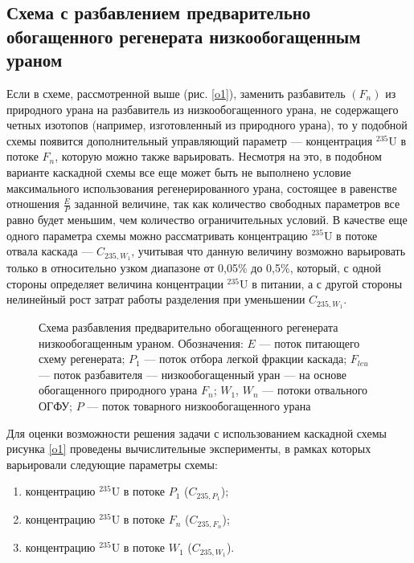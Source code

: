 \subsection{Схема с разбавлением предварительно обогащенного регенерата низкообогащенным ураном}\label{ch2_1_1}

Если в схеме, рассмотренной выше (рис. \ref{o1}), заменить разбавитель $(F_n)$ из природного урана на разбавитель из низкообогащенного урана, не содержащего четных изотопов (например, изготовленный из природного урана), то у подобной схемы появится дополнительный управляющий параметр --- концентрация $^{235}$U в потоке $F_n$, которую можно также варьировать. Несмотря на это, в подобном варианте каскадной схемы все еще может быть не выполнено условие максимального использования регенерированного урана, состоящее в равенстве отношения $\frac{E}{P}$ заданной величине, так как количество свободных параметров все равно будет меньшим, чем количество ограничительных условий. В качестве еще одного параметра схемы можно рассматривать концентрацию $^{235}$U в потоке отвала каскада --- $C_{235, W_1}$, учитывая что данную величину возможно варьировать только в относительно узком диапазоне от 0,05\% до 0,5\%, который, с одной стороны определяет величина концентрации $^{235}$U в питании, а с другой стороны нелинейный рост затрат работы разделения при уменьшении $C_{235, W_1}$. 

\begin{figure}[ht]
  \caption{Схема разбавления предварительно обогащенного регенерата низкообогащенным ураном. Обозначения: $E$ --- поток питающего схему регенерата; $P_1$ --- поток отбора легкой фракции каскада; $F_{leu}$ --- поток разбавителя --- низкообогащенный уран --- на основе обогащенного природного урана $F_n$; $W_1$, $W_n$ --- потоки отвального ОГФУ; $P$ --- поток товарного низкообогащенного урана}\label{ord_leu}
\end{figure}

Для оценки возможности решения задачи с использованием каскадной схемы рисунка \ref{o1} проведены вычислительные эксперименты, в рамках которых варьировали следующие параметры схемы:
\begin{enumerate}
  \item концентрацию $^{235}$U в потоке $P_1$ ($C_{235, P_1}$);
  \item концентрацию $^{235}$U в потоке $F_n$ ($C_{235, F_n}$);
  \item концентрацию $^{235}$U в потоке $W_1$ ($C_{235, W_1}$).
\end{enumerate}

